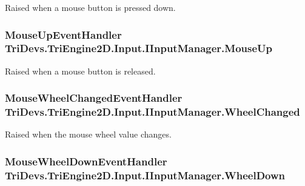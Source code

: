 Raised when a mouse button is pressed down. 

\hypertarget{interface_tri_devs_1_1_tri_engine2_d_1_1_input_1_1_i_input_manager_afbaf9eee227f333070ed9ff2c42a40c7}{
\subsubsection[{Mouse\-Up}]{\setlength{\rightskip}{0pt plus 5cm}Mouse\-Up\-Event\-Handler Tri\-Devs.\-Tri\-Engine2\-D.\-Input.\-I\-Input\-Manager.\-Mouse\-Up}}\label{interface_tri_devs_1_1_tri_engine2_d_1_1_input_1_1_i_input_manager_afbaf9eee227f333070ed9ff2c42a40c7}


Raised when a mouse button is released. 

\hypertarget{interface_tri_devs_1_1_tri_engine2_d_1_1_input_1_1_i_input_manager_ac560db0d881cbf110f713f5791e187ed}{
\subsubsection[{Wheel\-Changed}]{\setlength{\rightskip}{0pt plus 5cm}Mouse\-Wheel\-Changed\-Event\-Handler Tri\-Devs.\-Tri\-Engine2\-D.\-Input.\-I\-Input\-Manager.\-Wheel\-Changed}}\label{interface_tri_devs_1_1_tri_engine2_d_1_1_input_1_1_i_input_manager_ac560db0d881cbf110f713f5791e187ed}


Raised when the mouse wheel value changes. 

\hypertarget{interface_tri_devs_1_1_tri_engine2_d_1_1_input_1_1_i_input_manager_a8022b6f3d57b2e0acfa56af4d71099f9}{
\subsubsection[{Wheel\-Down}]{\setlength{\rightskip}{0pt plus 5cm}Mouse\-Wheel\-Down\-Event\-Handler Tri\-Devs.\-Tri\-Engine2\-D.\-Input.\-I\-Input\-Manager.\-Wheel\-Down}}\label{interface_tri_devs_1_1_tri_engine2_d_1_1_input_1_1_i_input_manager_a8022b6f3d57b2e0acfa56af4d71099f9}


